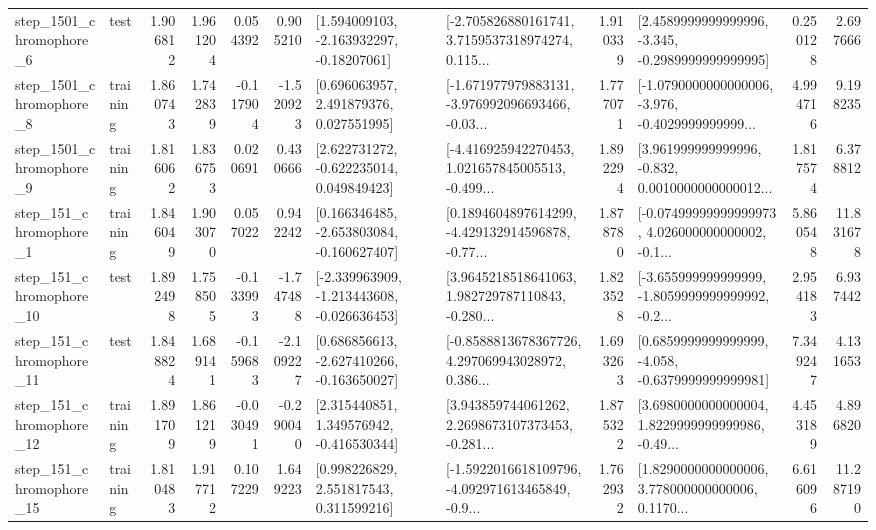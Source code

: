 \begin{tabular}{llrrrrllrlrr}
  step\_1501\_chromophore\_6 &      test &      1.906812 &    1.961204 &      0.054392 &  0.905210 &    [1.594009103, -2.163932297, -0.18207061] &  [-2.705826880161741, 3.7159537318974274, 0.115... &       1.910339 &  [2.4589999999999996, -3.345, -0.2989999999999995] &            0.250128 &          2.697666 \\
  step\_1501\_chromophore\_8 &  training &      1.860743 &    1.742839 &     -0.117904 & -1.520923 &     [0.696063957, 2.491879376, 0.027551995] &  [-1.671977979883131, -3.976992096693466, -0.03... &       1.777071 &  [-1.0790000000000006, -3.976, -0.4029999999999... &            4.994716 &          9.198235 \\
  step\_1501\_chromophore\_9 &  training &      1.816062 &    1.836753 &      0.020691 &  0.430666 &    [2.622731272, -0.622235014, 0.049849423] &  [-4.416925942270453, 1.021657845005513, -0.499... &       1.892294 &  [3.961999999999996, -0.832, 0.0010000000000012... &            1.817574 &          6.378812 \\
   step\_151\_chromophore\_1 &  training &      1.846049 &    1.903070 &      0.057022 &  0.942242 &   [0.166346485, -2.653803084, -0.160627407] &  [0.1894604897614299, -4.429132914596878, -0.77... &       1.878780 &  [-0.07499999999999973, 4.026000000000002, -0.1... &            5.860548 &         11.831678 \\
  step\_151\_chromophore\_10 &      test &      1.892498 &    1.758505 &     -0.133993 & -1.747488 &  [-2.339963909, -1.213443608, -0.026636453] &  [3.9645218518641063, 1.982729787110843, -0.280... &       1.823528 &  [-3.655999999999999, -1.8059999999999992, -0.2... &            2.954183 &          6.937442 \\
  step\_151\_chromophore\_11 &      test &      1.848824 &    1.689141 &     -0.159683 & -2.109227 &   [0.686856613, -2.627410266, -0.163650027] &  [-0.8588813678367726, 4.297069943028972, 0.386... &       1.693263 &  [0.6859999999999999, -4.058, -0.6379999999999981] &            7.349247 &          4.131653 \\
  step\_151\_chromophore\_12 &  training &      1.891709 &    1.861219 &     -0.030491 & -0.290040 &    [2.315440851, 1.349576942, -0.416530344] &  [3.943859744061262, 2.2698673107373453, -0.281... &       1.875322 &  [3.6980000000000004, 1.8229999999999986, -0.49... &            4.453189 &          4.896820 \\
  step\_151\_chromophore\_15 &  training &      1.810483 &    1.917712 &      0.107229 &  1.649223 &     [0.998226829, 2.551817543, 0.311599216] &  [-1.5922016618109796, -4.092971613465849, -0.9... &       1.762932 &  [1.8290000000000006, 3.778000000000006, 0.1170... &            6.616096 &         11.287190 \\

\end{tabular}
